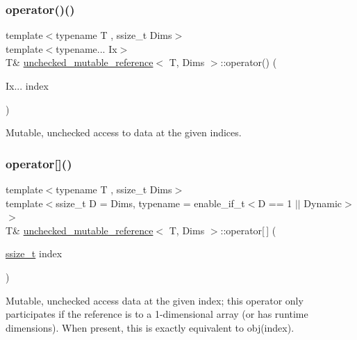 \subsubsection{\texorpdfstring{operator()()}{operator()()}}
{\footnotesize\ttfamily template$<$typename T , ssize\+\_\+t Dims$>$ \\
template$<$typename... Ix$>$ \\
T\& \mbox{\hyperlink{classunchecked__mutable__reference}{unchecked\+\_\+mutable\+\_\+reference}}$<$ T, Dims $>$\+::operator() (\begin{DoxyParamCaption}\item[{Ix...}]{index }\end{DoxyParamCaption})\hspace{0.3cm}{\ttfamily [inline]}}



Mutable, unchecked access to data at the given indices. 

\mbox{\label{classunchecked__mutable__reference_a9580101363d95e99c1cf2d58d072c289}} 
\subsubsection{\texorpdfstring{operator[]()}{operator[]()}}
{\footnotesize\ttfamily template$<$typename T , ssize\+\_\+t Dims$>$ \\
template$<$ssize\+\_\+t D = Dims, typename  = enable\+\_\+if\+\_\+t$<$\+D == 1 $\vert$$\vert$ Dynamic$>$$>$ \\
T\& \mbox{\hyperlink{classunchecked__mutable__reference}{unchecked\+\_\+mutable\+\_\+reference}}$<$ T, Dims $>$\+::operator\mbox{[}$\,$\mbox{]} (\begin{DoxyParamCaption}\item[{\mbox{\hyperlink{detail_2common_8h_ac430d16fc097b3bf0a7469cfd09decda}{ssize\+\_\+t}}}]{index }\end{DoxyParamCaption})\hspace{0.3cm}{\ttfamily [inline]}}

Mutable, unchecked access data at the given index; this operator only participates if the reference is to a 1-\/dimensional array (or has runtime dimensions). When present, this is exactly equivalent to {\ttfamily obj(index)}. 


